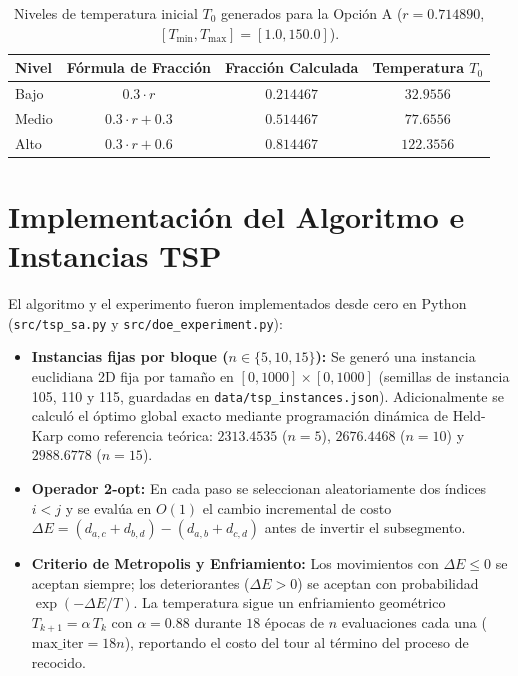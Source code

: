 \documentclass[11pt,letterpaper]{article}
\begin{document}
\begin{table}[H]
\centering
\caption{Niveles de temperatura inicial $T_0$ generados para la Opción A ($r = 0.714890$, $[T_{\min}, T_{\max}] = [1.0, 150.0]$).}
\label{tab:niveles}
\begin{tabular}{@{}lccc@{}}
\toprule
\textbf{Nivel} & \textbf{Fórmula de Fracción} & \textbf{Fracción Calculada} & \textbf{Temperatura $T_0$} \\
\midrule
Bajo  & $0.3 \cdot r$       & $0.214467$ & $32.9556$ \\
Medio & $0.3 \cdot r + 0.3$ & $0.514467$ & $77.6556$ \\
Alto  & $0.3 \cdot r + 0.6$ & $0.814467$ & $122.3556$ \\
\bottomrule
\end{tabular}
\end{table}

\section{\color{rojouanl} Implementación del Algoritmo e Instancias TSP}

El algoritmo y el experimento fueron implementados desde cero en Python (\texttt{src/tsp\_sa.py} y \texttt{src/doe\_experiment.py}):
\begin{itemize}
    \item \textbf{Instancias fijas por bloque ($n \in \{5, 10, 15\}$):} Se generó una instancia euclidiana 2D fija por tamaño en $[0, 1000] \times [0, 1000]$ (semillas de instancia 105, 110 y 115, guardadas en \texttt{data/tsp\_instances.json}). Adicionalmente se calculó el óptimo global exacto mediante programación dinámica de Held-Karp como referencia teórica: $2313.4535$ ($n=5$), $2676.4468$ ($n=10$) y $2988.6778$ ($n=15$).
    \item \textbf{Operador 2-opt:} En cada paso se seleccionan aleatoriamente dos índices $i < j$ y se evalúa en $O(1)$ el cambio incremental de costo $\Delta E = (d_{a,c} + d_{b,d}) - (d_{a,b} + d_{c,d})$ antes de invertir el subsegmento.
    \item \textbf{Criterio de Metropolis y Enfriamiento:} Los movimientos con $\Delta E \le 0$ se aceptan siempre; los deteriorantes ($\Delta E > 0$) se aceptan con probabilidad $\exp(-\Delta E / T)$. La temperatura sigue un enfriamiento geométrico $T_{k+1} = \alpha \, T_k$ con $\alpha = 0.88$ durante $18$ épocas de $n$ evaluaciones cada una ($\text{max\_iter} = 18n$), reportando el costo del tour al término del proceso de recocido.
\end{itemize}
\end{document}
